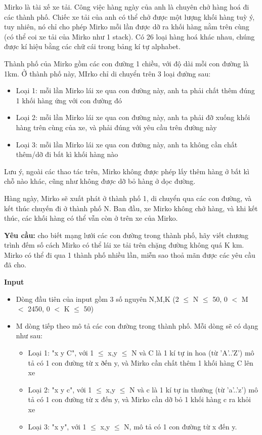 

Mirko là tài xế xe tải. Công việc hàng ngày của anh là chuyên chở hàng hoá đi các thành phố. Chiếc xe tải của anh có thể chở được một lượng khối hàng tuỳ ý, tuy nhiên, nó chỉ cho phép Mirko mỗi lần được dỡ ra khối hàng nằm trên cùng (có thể coi xe tải của Mirko như 1 stack). Có 26 loại hàng hoá khác nhau, chúng được kí hiệu bằng các chữ cái trong bảng kí tự alphabet.





Thành phố của Mirko gồm các con đường 1 chiều, với độ dài mỗi con đường là 1km. Ở thành phố này, MIrko chỉ di chuyển trên 3 loại đường sau:
\begin{itemize}
	\item Loại 1: mỗi lần Mirko lái xe qua con đường này, anh ta phải chất thêm đúng 1 khối hàng ứng với con đường đó
	\item Loại 2: mỗi lần Mirko lái xe qua con đường này, anh ta phải đỡ xuống khối hàng trên cùng của xe, và phải đúng với yêu cầu trên đường này
	\item Loại 3: mỗi lần Mirko lái xe qua con đường này, anh ta không cần chất thêm/dỡ đi bất kì khối hàng nào
\end{itemize}

Lưu ý, ngoài các thao tác trên, Mirko không được phép lấy thêm hàng ở bất kì chỗ nào khác, cũng như không được dỡ bỏ hàng ở dọc đường.





Hàng ngày, Mirko sẽ xuất phát ở thành phố 1, di chuyển qua các con đường, và kết thúc chuyến đi ở thành phố N. Ban đầu, xe Mirko không chở hàng, và khi kết thúc, các khối hàng có thể vẫn còn ở trên xe của Mirko.





\textbf{Yêu cầu:} cho biết mạng lưới các con đường trong thành phố, hãy viết chương trình đếm số cách Mirko có thể lái xe tải trên chặng đường không quá K km. Mirko có thể đi qua 1 thành phố nhiều lần, miễn sao thoả mãn được các yêu cầu đã cho.





\textbf{Input}
\begin{itemize}
	\item Dòng đầu tiên của input gồm 3 số nguyên N,M,K (2  $\le$  N  $\le$  50, 0 $<$ M $<$ 2450, 0 $<$ K  $\le$  50)
	\item M dòng tiếp theo mô tả các con đường trong thành phố. Mỗi dòng sẽ có dạng như sau:
\begin{itemize}
	\item Loại 1: "x y C", với 1  $\le$  x,y  $\le$  N và C là 1 kí tự in hoa (từ 'A'..'Z') mô tả có 1 con đường từ x ðến y, và Mirko cần chất thêm 1 khối hàng C lên xe
	\item Loại 2: "x y c", với 1  $\le$  x,y  $\le$  N và c là 1 kí tự in thường (từ 'a'..'z') mô tả có 1 con đường từ x đến y, và Mirko cần dỡ bỏ 1 khối hàng c ra khỏi xe
	\item Loại 3: "x y", với 1  $\le$  x,y  $\le$  N, mô tả có 1 con đường từ x đến y.
\end{itemize}
\end{itemize}

